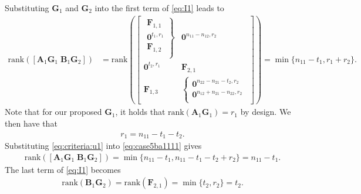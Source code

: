 \documentclass[12pt, draftclsnofoot, onecolumn]{IEEEtran}
\theoremstyle{definition}
\begin{document}
Substituting $\boldsymbol{G}_1$ and $\boldsymbol{G}_2$ into the first term of \eqref{eq:I1} leads to
\begin{align}\label{eq:case5ba1111}
\text{rank}([\boldsymbol{A}_1\boldsymbol{G}_1 \; \boldsymbol{B}_1\boldsymbol{G}_2]) &=\text{rank}\left(\begin{bmatrix}
\left. {\begin{array}{*{20}{c}}
\boldsymbol{F}_{1,1} \\
\boldsymbol{0}^{t_1,r_1} \\
\boldsymbol{F}_{1,2}  \\
\end{array}} \right\} & \boldsymbol{0}^{n_{11}-n_{12},r_2}\\
\boldsymbol{0}^{t_2,r_1} &  \boldsymbol{F}_{2,1} \\
\boldsymbol{F}_{1,3} &  \left\{ {\begin{array}{*{20}{c}}
\boldsymbol{0}^{n_{22}-n_{21}-t_2,r_2}\\
\boldsymbol{0}^{n_{12}+n_{21}-n_{22},r_2}\\
\end{array}} \right.
\end{bmatrix}
\right) %
= \min\{n_{11}-t_1,r_1+r_2\}.
\end{align}
Note that for our proposed $\boldsymbol{G}_1$, it holds that $\text{rank}(\boldsymbol{A}_1\boldsymbol{G}_1)=r_1$ by design. We then have that
\begin{align}\label{eq:criteria:u1}
r_1 = n_{11}-t_1-t_2.
\end{align}
Substituting \eqref{eq:criteria:u1} into \eqref{eq:case5ba1111} gives
\begin{align}\label{eq:case5ba1112}
\text{rank}([\boldsymbol{A}_1\boldsymbol{G}_1 \; \boldsymbol{B}_1\boldsymbol{G}_2]) = \min\{n_{11}-t_1 ,n_{11}-t_1-t_2+r_2\} = n_{11}-t_1.
\end{align}
The last term of \eqref{eq:I1} becomes
\begin{align}\label{eq:case5ba1a111}
\text{rank}(\boldsymbol{B}_1\boldsymbol{G}_2) = \text{rank}(\boldsymbol{F}_{2,1}) = \min\{t_2,r_2\}=t_2.
\end{align}
\end{document}
